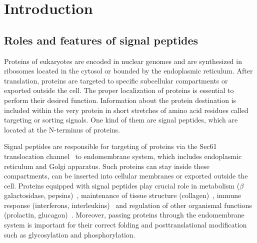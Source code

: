 \documentclass[10pt,letterpaper]{article}
\begin{document}
\linenumbers

\section*{Introduction}
\subsection*{Roles and features of signal peptides}

Proteins of eukaryotes are encoded in nuclear genomes and are synthesized in ribosomes located in the cytosol or bounded by the endoplasmic reticulum. After translation, proteins are targeted to specific subcellular compartments or exported outside the cell. The proper localization of proteins is essential to perform their desired function. Information about the protein destination is included within the very protein in short stretches of amino acid residues called targeting or sorting signals. One kind of them are signal peptides, which are located at the N-terminus of proteins.

Signal peptides are responsible for targeting of proteins via the Sec61 translocation channel~\cite{2007rapoportprotein} to endomembrane system, which includes endoplasmic reticulum and Golgi apparatus. Such proteins can stay inside these compartments, can be inserted into cellular membranes or exported outside the cell. Proteins equipped with signal peptides play crucial role in metabolism ($\beta$ galactosidase, pepsins)~\cite{1991hofmannmutations}, maintenance of tissue structure (collagen)~\cite{2001chanaberrant}, immune response (interferons, interleukins)~\cite{2005zhangalteration} and regulation of other organismal functions (prolactin, glucagon)~\cite{2010huangrole}. Moreover, passing proteins through the endomembrane system is important for their correct folding and posttranslational modification such as glycosylation and phosphorylation.
\end{document}
